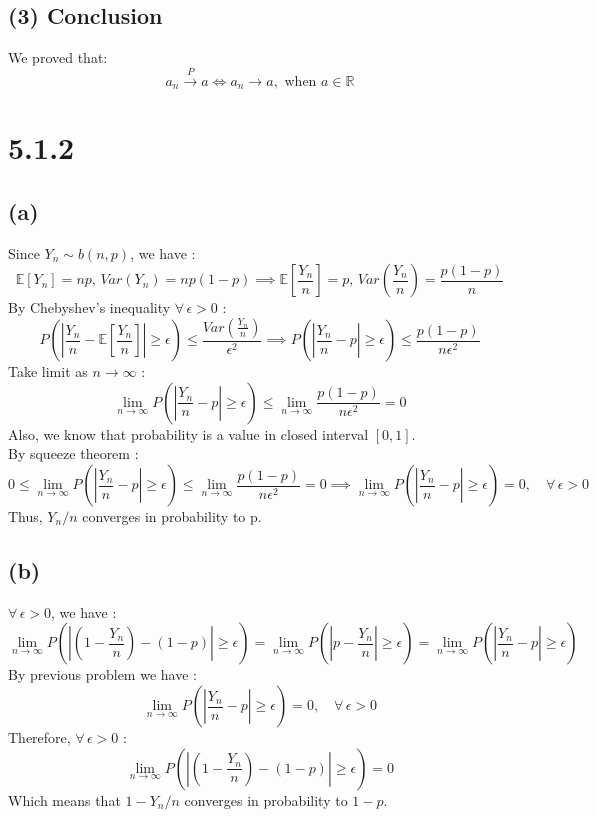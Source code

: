 \documentclass{article}
\begin{document}
\subsection*{(3) Conclusion}
We proved that:
\[
    a_n \xrightarrow{P} a \iff a_n \to a ,\text{ when } a \in \mathbb{R}
\]
\section*{5.1.2}
\subsection*{(a)}
Since $Y_n \sim b(n, p)$, we have :
\[
    \mathbb{E}[Y_n] = np ,\, Var(Y_n) = np(1-p) \implies
    \mathbb{E}\left[\frac{Y_n}{n}\right] = p ,\, Var\left(\frac{Y_n}{n}\right) = \frac{p(1-p)}{n}
\]
By Chebyshev's inequality $\forall \, \epsilon > 0$ :
\[
P\left(\left|\frac{Y_n}{n} - \mathbb{E}\left[\frac{Y_n}{n}\right]\right| \ge \epsilon \right) \le 
\frac{Var\left(\frac{Y_n}{n}\right)}{\epsilon^2} \implies
P\left(\left|\frac{Y_n}{n} - p\right| \ge \epsilon \right) \le \frac{p(1-p)}{n \epsilon^2}
\]
Take limit as $n \rightarrow \infty$ :
\[
\lim_{n \rightarrow \infty}P\left(\left|\frac{Y_n}{n} - p\right| \ge \epsilon \right) \le 
\lim_{n \rightarrow \infty} \frac{p(1-p)}{n \epsilon^2} = 0
\]
Also, we know that probability is a value in closed interval $[0,1]$.\\
By squeeze theorem :
\[
0 \le \lim_{n \rightarrow \infty}P\left(\left|\frac{Y_n}{n} - p\right| \ge \epsilon \right) \le 
\lim_{n \rightarrow \infty} \frac{p(1-p)}{n \epsilon^2} = 0 \implies 
\lim_{n \rightarrow \infty}P\left(\left|\frac{Y_n}{n} - p\right| \ge \epsilon \right) = 0,
\quad \forall \, \epsilon > 0
\]
Thus, $Y_n / n$ converges in probability to p.
\subsection*{(b)}
$\forall \, \epsilon > 0$, we have :
\[
\lim_{n \rightarrow \infty}P\left(\left|\left(1-\frac{Y_n}{n}\right) 
- (1-p)\right| \ge \epsilon \right) = 
\lim_{n \rightarrow \infty}P\left(\left|p-\frac{Y_n}{n}\right| \ge \epsilon \right)
= \lim_{n \rightarrow \infty}P\left(\left|\frac{Y_n}{n}-p\right| \ge \epsilon \right)
\]
By previous problem we have :
\[
\lim_{n \rightarrow \infty}P\left(\left|\frac{Y_n}{n}-p\right| \ge \epsilon \right) = 0 ,
\quad \forall \, \epsilon > 0 
\]
Therefore, $\forall \, \epsilon > 0$ :
\[
\lim_{n \rightarrow \infty}P\left(\left|\left(1-\frac{Y_n}{n}\right) 
- (1-p)\right| \ge \epsilon \right) = 0
\]
Which means that $1-Y_n / n$ converges in probability to $1-p$.
\end{document}
